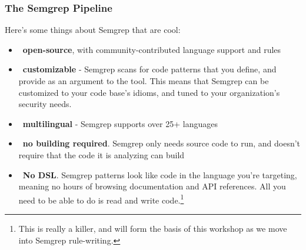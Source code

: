\documentclass[aspectratio=169, handout]{beamer}
\begin{document}
\begin{frame}[fragile]
  \frametitle{The Semgrep Pipeline}

  Here's some things about Semgrep that are cool:

  \pause

  \begin{itemize}
    \item {\color{auxColor}\faBookOpen} \, \textbf{open-source}, with community-contributed language support and rules
    \pause
    \item {\color{auxColor}\faPen} \, \textbf{customizable} - Semgrep scans for code patterns that you define, and provide
    as an argument to the tool. This means that Semgrep can be customized to your code
    base's idioms, and tuned to your organization's security needs.
    \pause
    \item {\color{auxColor}\faFont} \, \textbf{multilingual} - Semgrep supports over 25+ languages
    \pause
    \item {\color{auxColor}\faTimes} \, \textbf{no building required}. Semgrep only needs source code to run, and doesn't
    require that the code it is analyzing can build
    \pause
    \item {\color{auxColor}\faLightbulb} \, \textbf{No DSL}. Semgrep patterns look like code in the language you're targeting,
    meaning no hours of browsing documentation and API references. All you need to be able
    to do is read and write code.\footnote{This is really a killer, and will form the basis
    of this workshop as we move into Semgrep rule-writing.}
  \end{itemize}
\end{frame}
\end{document}
